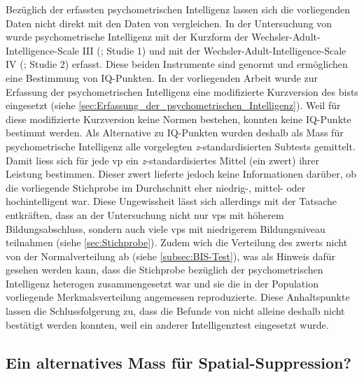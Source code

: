 \documentclass[11pt, twoside, a4paper]{book}		%
\begin{document}
Bezüglich der erfassten psychometrischen Intelligenz lassen sich die vorliegenden Daten nicht direkt mit den Daten von \citet{Melnick2013} vergleichen. In der Untersuchung von \citeauthor{Melnick2013} wurde psychometrische Intelligenz mit der Kurzform der Wechsler-Adult-Intelligence-Scale III (\citealp{Axelrod2002}; Studie 1) und mit der Wechsler-Adult-In\-tell\-igence-Scale IV (\citealp{Wechsler2008}; Studie 2) erfasst. Diese beiden Instrumente sind genormt und ermöglichen eine Bestimmung von IQ-Punkten. In der vorliegenden Arbeit wurde zur Erfassung der psychometrischen Intelligenz eine modifizierte Kurzversion des \gls{bist}s eingesetzt (siehe \autoref{sec:Erfassung_der_psychometrischen_Intelligenz}). Weil für diese modifizierte Kurzversion keine Normen bestehen, konnten keine IQ-Punkte bestimmt werden. Als Alternative zu IQ-Punkten wurden deshalb als Mass für psychometrische Intelligenz alle vorgelegten \textit{z}-standardisierten Subtests gemittelt. Damit liess sich für jede \gls{vp} ein \textit{z}-standardisiertes Mittel (ein \gls{zwert}) ihrer Leistung bestimmen. Dieser \gls{zwert} lieferte jedoch keine Informationen darüber, ob die vorliegende Stichprobe im Durchschnitt eher niedrig-, mittel- oder hochintelligent war. Diese Ungewissheit lässt sich allerdings mit der Tatsache entkräften, dass an der Untersuchung nicht nur \glspl{vp} mit höherem Bildungsabschluss, sondern auch viele \glspl{vp} mit niedrigerem Bildungsniveau teilnahmen (siehe \autoref{sec:Stichprobe}). 
Zudem wich die Verteilung des \gls{zwert}s nicht von der Normalverteilung ab (siehe \autoref{subsec:BIS-Test}), was als Hinweis dafür gesehen werden kann, dass die Stichprobe bezüglich der psychometrischen Intelligenz heterogen zusammengesetzt war und sie die in der Population vorliegende Merkmalsverteilung angemessen reproduzierte. Diese Anhaltspunkte lassen die Schlussfolgerung zu, dass die Befunde von \citeauthor{Melnick2013} nicht alleine deshalb nicht bestätigt werden konnten, weil ein anderer Intelligenztest eingesetzt wurde.



\subsection{Ein alternatives Mass für Spatial-Suppression? \label{subsec:Ein_alternatives_Mass_für_SS?}}
\end{document}
